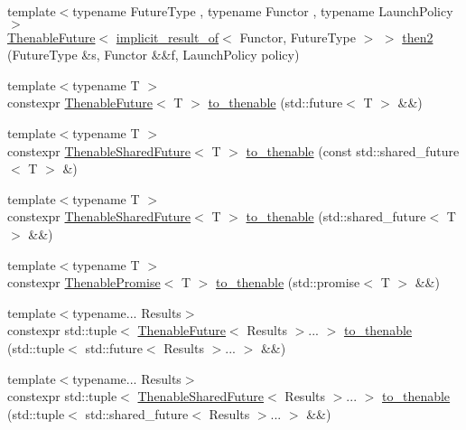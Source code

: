 \begin{DoxyCompactItemize}
\item 
{\footnotesize template$<$typename Future\+Type , typename Functor , typename Launch\+Policy $>$ }\\\hyperlink{classthenable_1_1_thenable_future}{Thenable\+Future}$<$ \hyperlink{namespacethenable_a1ecf08d6ad8b8688d7b4df047b5feaae}{implicit\+\_\+result\+\_\+of}$<$ Functor, Future\+Type $>$ $>$ \hyperlink{namespacethenable_ac29edcabcae561565e668dfd0fd31217}{then2} (Future\+Type \&s, Functor \&\&f, Launch\+Policy policy)
\item 
{\footnotesize template$<$typename T $>$ }\\constexpr \hyperlink{classthenable_1_1_thenable_future}{Thenable\+Future}$<$ T $>$ \hyperlink{namespacethenable_a237a7d314a81a8be6fb40574e7454949}{to\+\_\+thenable} (std\+::future$<$ T $>$ \&\&)
\item 
{\footnotesize template$<$typename T $>$ }\\constexpr \hyperlink{classthenable_1_1_thenable_shared_future}{Thenable\+Shared\+Future}$<$ T $>$ \hyperlink{namespacethenable_aae28a1f0e9368b6aedfee55957e0c772}{to\+\_\+thenable} (const std\+::shared\+\_\+future$<$ T $>$ \&)
\item 
{\footnotesize template$<$typename T $>$ }\\constexpr \hyperlink{classthenable_1_1_thenable_shared_future}{Thenable\+Shared\+Future}$<$ T $>$ \hyperlink{namespacethenable_a9b8be419c3f5f5420a48bd68ea458f15}{to\+\_\+thenable} (std\+::shared\+\_\+future$<$ T $>$ \&\&)
\item 
{\footnotesize template$<$typename T $>$ }\\constexpr \hyperlink{classthenable_1_1_thenable_promise}{Thenable\+Promise}$<$ T $>$ \hyperlink{namespacethenable_a6e1e0d7d9fee302429067e4a1f7c2436}{to\+\_\+thenable} (std\+::promise$<$ T $>$ \&\&)
\item 
{\footnotesize template$<$typename... Results$>$ }\\constexpr std\+::tuple$<$ \hyperlink{classthenable_1_1_thenable_future}{Thenable\+Future}$<$ Results $>$... $>$ \hyperlink{namespacethenable_a9337c975d6426aaf9f76ad790c3b3a93}{to\+\_\+thenable} (std\+::tuple$<$ std\+::future$<$ Results $>$... $>$ \&\&)
\item 
{\footnotesize template$<$typename... Results$>$ }\\constexpr std\+::tuple$<$ \hyperlink{classthenable_1_1_thenable_shared_future}{Thenable\+Shared\+Future}$<$ Results $>$... $>$ \hyperlink{namespacethenable_a444ece5332d86fa1ded34452ffca0767}{to\+\_\+thenable} (std\+::tuple$<$ std\+::shared\+\_\+future$<$ Results $>$... $>$ \&\&)

\end{DoxyCompactItemize}
